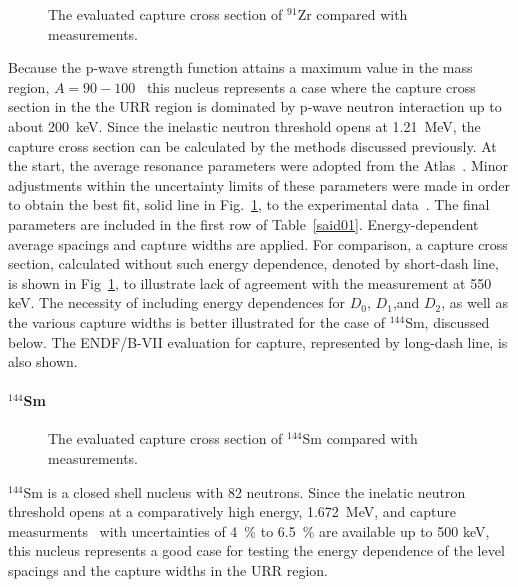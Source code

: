 \documentclass[twocolumn,amsmath,amssymb,10pt,groupedaddress,a4paper]{revtex4}
\begin{document}
\begin{figure}[htbp]
\caption{The evaluated capture cross section of $^{91}$Zr compared with measurements.}
\label{zr91b}
\end{figure}
Because the p-wave strength function attains a maximum value in the mass region, $A=90-100$~\cite{Mughabghab:06} this nucleus represents a case where the capture cross section in the the URR region is dominated by p-wave neutron interaction  up to about 200~keV. Since the inelastic  neutron threshold opens at 1.21~MeV, the capture cross section can be calculated by the methods discussed previously. At the start, the average resonance parameters were adopted from the Atlas~\cite{Mughabghab:06}. Minor adjustments  within the uncertainty limits of these parameters were made in order to obtain the best fit, solid line in Fig.~\ref{zr91b}, to the experimental data~\cite{Ohmaga:05,Musgrove:77,Kapchi:65}. The final parameters are included in the first row of Table~\ref{said01}. Energy-dependent average spacings and capture widths are applied. For comparison, a  capture cross section,  calculated without such energy dependence, denoted by short-dash line,  is shown in Fig~\ref{zr91b}, to  illustrate lack of agreement with the measurement at 550 keV. The necessity of including energy dependences for $D_0$, $D_1$,and $D_2$, as well as the various capture widths is better illustrated for the case of $^{144}$Sm, discussed below. The ENDF/B-VII evaluation for capture, represented by long-dash line, is also shown.

\paragraph{$^{144}$Sm}
\begin{figure}[htbp]
\caption{The evaluated capture cross section of $^{144}$Sm compared with measurements. }
\label{144sm}
\end{figure}
$^{144}$Sm  is a closed shell nucleus with 82 neutrons. Since the inelatic neutron threshold opens at  a comparatively high energy, 1.672~MeV, and capture measurments~\cite{Macklin:93} with uncertainties of 4~\%  to 6.5~\%  are available up to 500 keV, this nucleus represents a good case for testing the energy dependence of the level spacings and the capture widths in the URR region.
\end{document}

